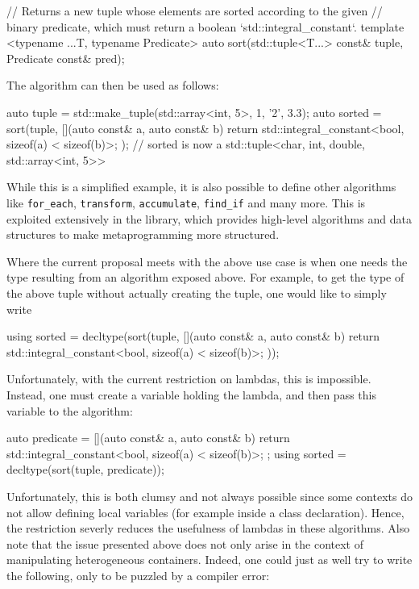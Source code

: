 \documentclass[11pt]{article}
\newcommand{\cc}[1]{\texttt{#1}}
\begin{document}
\begin{cpp}
// Returns a new tuple whose elements are sorted according to the given
// binary predicate, which must return a boolean `std::integral_constant`.
template <typename ...T, typename Predicate>
auto sort(std::tuple<T...> const& tuple, Predicate const& pred);
\end{cpp}

The algorithm can then be used as follows:

\begin{cpp}
auto tuple = std::make_tuple(std::array<int, 5>{}, 1, '2', 3.3);
auto sorted = sort(tuple, [](auto const& a, auto const& b) {
  return std::integral_constant<bool, sizeof(a) < sizeof(b)>{};
});
// sorted is now a std::tuple<char, int, double, std::array<int, 5>>
\end{cpp}

While this is a simplified example, it is also possible to define other algorithms
like \cc{for_each}, \cc{transform}, \cc{accumulate}, \cc{find_if} and many more. This
is exploited extensively in the \cite{Boost.Hana} library, which provides high-level
algorithms and data structures to make metaprogramming more structured.

Where the current proposal meets with the above use case is when one needs the type
resulting from an algorithm exposed above. For example, to get the type of the above
tuple without actually creating the tuple, one would like to simply write

\begin{cpp}
using sorted = decltype(sort(tuple, [](auto const& a, auto const& b) {
  return std::integral_constant<bool, sizeof(a) < sizeof(b)>{};
}));
\end{cpp}

Unfortunately, with the current restriction on lambdas, this is impossible.
Instead, one must create a variable holding the lambda, and then pass this
variable to the algorithm:

\begin{cpp}
auto predicate = [](auto const& a, auto const& b) {
  return std::integral_constant<bool, sizeof(a) < sizeof(b)>{};
};
using sorted = decltype(sort(tuple, predicate));
\end{cpp}

Unfortunately, this is both clumsy and not always possible since some contexts
do not allow defining local variables (for example inside a class declaration).
Hence, the restriction severly reduces the usefulness of lambdas in these algorithms.
Also note that the issue presented above does not only arise in the context of
manipulating heterogeneous containers. Indeed, one could just as well try to
write the following, only to be puzzled by a compiler error:
\end{document}

